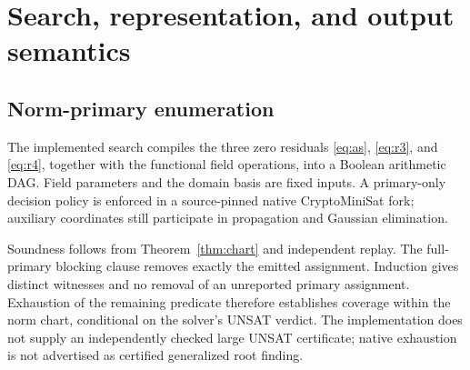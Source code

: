\section{Search, representation, and output semantics}
\subsection{Norm-primary enumeration}
The implemented search  compiles the three zero residuals
\eqref{eq:as}, \eqref{eq:r3}, and \eqref{eq:r4}, together with the functional
field operations, into a Boolean arithmetic DAG. Field parameters and the
domain basis are fixed inputs. A primary-only decision policy is enforced
in a source-pinned native CryptoMiniSat fork; auxiliary coordinates still
participate in propagation and Gaussian elimination.

\begin{center}
\end{center}

Soundness follows from Theorem~\ref{thm:chart} and independent replay.
The full-primary blocking clause removes exactly the emitted assignment.
Induction gives distinct witnesses and no removal of an unreported primary
assignment. Exhaustion of the remaining predicate therefore establishes
coverage within the norm chart, conditional on the solver's UNSAT verdict.
The implementation does not supply an independently checked large UNSAT
certificate; native exhaustion is not advertised as certified generalized
root finding.

